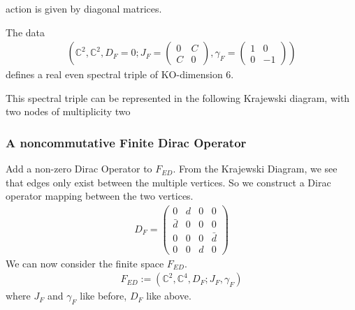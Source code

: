 action is given by diagonal matrices.
\begin{proposition}
    The data
    \begin{align}
        \left( \mathbb{C}^2, \mathbb{C}^2, D_F=0; J_F =
        \begin{pmatrix}
            0 & C \\ C &0
        \end{pmatrix},
        \gamma _F =
        \begin{pmatrix}
            1 & 0 \\ 0 &-1
        \end{pmatrix}
        \right)
    \end{align}
    defines a real even spectral triple of KO-dimension 6.
\end{proposition}
This spectral triple can be represented in the following Krajewski diagram,
with two nodes of multiplicity two
    \begin{figure}[h!] \centering
    \end{figure}
\subsubsection{A noncommutative Finite Dirac Operator}
Add a non-zero Dirac Operator to $F_{ED}$. From the Krajewski Diagram, we see
that edges only exist between the multiple vertices. So we construct a Dirac
operator mapping between the two vertices.
\begin{align}\label{dirac}
    D_F =
    \begin{pmatrix}
    0 & d & 0 & 0 \\
    \bar{d} & 0 & 0 & 0 \\
    0 & 0 & 0 & \bar{d} \\
    0 & 0 & d & 0
    \end{pmatrix}
\end{align}
We can now consider the finite space $F_{ED}$.
\begin{align}
    F_{ED} := (\mathbb{C}^2, \mathbb{C}^4, D_F; J_F, \gamma_F)
\end{align}
where $J_F$ and $\gamma_F$ like before, $D_F$ like above.
